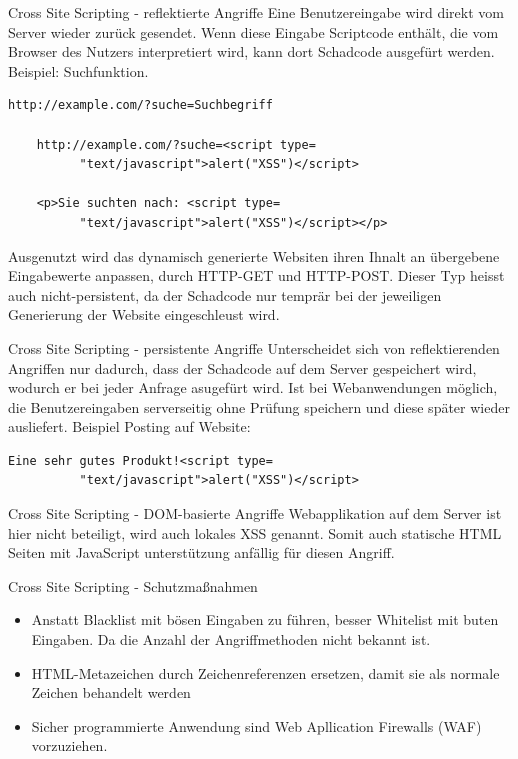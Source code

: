 \documentclass[10pt]{beamer}
\begin{document}
\begin{frame}[fragile]{Cross Site Scripting - reflektierte Angriffe}
  Eine Benutzereingabe wird direkt vom Server wieder zur\"uck gesendet.
  Wenn diese Eingabe Scriptcode enth\"alt, die vom Browser des Nutzers interpretiert wird, kann dort Schadcode ausgef\"urt werden.
  Beispiel: Suchfunktion.
  \begin{lstlisting}[style=CStyle]
    http://example.com/?suche=Suchbegriff

    http://example.com/?suche=<script type=
          "text/javascript">alert("XSS")</script>

    <p>Sie suchten nach: <script type=
          "text/javascript">alert("XSS")</script></p>
  \end{lstlisting}
  Ausgenutzt wird das dynamisch generierte Websiten ihren Ihnalt an \"ubergebene Eingabewerte anpassen, durch HTTP-GET und HTTP-POST.
  Dieser Typ heisst auch nicht-persistent, da der Schadcode nur tempr\"ar bei der jeweiligen Generierung der Website eingeschleust wird.
\end{frame}

\begin{frame}[fragile]{Cross Site Scripting - persistente Angriffe}
  Unterscheidet sich von reflektierenden Angriffen nur dadurch, dass der Schadcode auf dem Server gespeichert wird, wodurch er bei jeder Anfrage asugef\"urt wird.
  Ist bei Webanwendungen m\"oglich, die Benutzereingaben serverseitig ohne Pr\"ufung speichern und diese sp\"ater wieder ausliefert.
  Beispiel Posting auf Website:
  \begin{lstlisting}[style=CStyle]
    Eine sehr gutes Produkt!<script type=
          "text/javascript">alert("XSS")</script>
  \end{lstlisting}
\end{frame}

\begin{frame}[fragile]{Cross Site Scripting - DOM-basierte Angriffe}
  Webapplikation auf dem Server ist hier nicht beteiligt, wird auch lokales XSS genannt.
  Somit auch statische HTML Seiten mit JavaScript unterst\"utzung anf\"allig f\"ur diesen Angriff.
\end{frame}

\begin{frame}[fragile]{Cross Site Scripting - Schutzma{\ss}nahmen}
  \begin{itemize}
    \item Anstatt Blacklist mit b\"osen Eingaben zu f\"uhren, besser Whitelist mit buten Eingaben. Da die Anzahl der Angriffmethoden nicht bekannt ist.
    \item HTML-Metazeichen durch Zeichenreferenzen ersetzen, damit sie als normale Zeichen behandelt werden
    \item Sicher programmierte Anwendung sind Web Apllication Firewalls (WAF) vorzuziehen.
  \end{itemize}
\end{frame}
\end{document}
